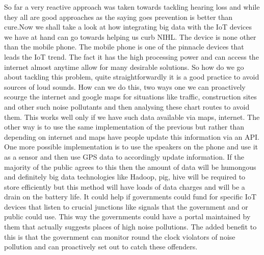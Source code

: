 \documentclass[sigconf]{acmart}
\begin{document}
So far a very reactive approach was taken towards tackling hearing loss and while they all are good approaches as the saying goes prevention is better than cure.Now we shall take a look at how integrating big data with the IoT devices we have at hand can go towards helping us curb NIHL. The device is none other than the mobile phone. The mobile phone is one of the pinnacle devices that leads the IoT trend. The fact it has the high processing power and can access the internet almost anytime allow for many desirable solutions. So how do we go about tackling this problem, quite straightforwardly it is a good practice to avoid sources of loud sounds. How can we do this, two ways one we can proactively scourge the internet and google maps for situations like traffic, construction sites and other such noise pollutants and then analysing these chart routes to avoid them. This works well only if we have such data available via maps, internet. The other way is to use the same implementation of the previous but rather than depending on internet and maps have people update this information via an API. One more possible implementation is to use the speakers on the phone and use it as a sensor and then use GPS data to accordingly update information. If the majority of the public agrees to this then the amount of data will be humongous and definitely big data technologies like Hadoop, pig, hive will be required to store efficiently but this method will have loads of data charges and will be a drain on the battery life. It could help if governments could fund for specific IoT devices that listen to crucial junctions like signals that the government and or public could use. This way the governments could have a portal maintained by them that actually suggests places of high noise pollutions. The added benefit to this is that the government can monitor round the clock violators of noise pollution and can proactively set out to catch these offenders.
\newline
\end{document}
